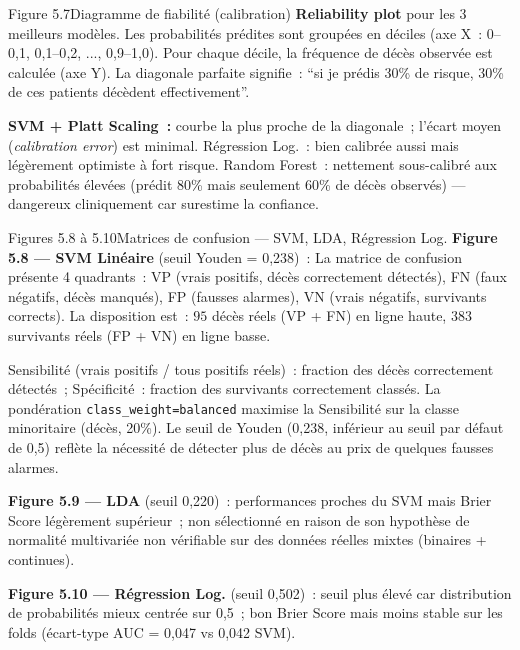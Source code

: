 \documentclass[12pt,a4paper]{article}
\begin{document}
\begin{figbox}{Figure 5.7}{Diagramme de fiabilité (calibration)}
\textbf{Reliability plot} pour les 3 meilleurs modèles. Les probabilités prédites
sont groupées en déciles (axe X~: 0--0{,}1, 0{,}1--0{,}2, ..., 0{,}9--1{,}0).
Pour chaque décile, la fréquence de décès observée est calculée (axe Y).
La diagonale parfaite signifie~: ``si je prédis 30\% de risque, 30\% de ces
patients décèdent effectivement''.

\textbf{SVM + Platt Scaling~:} courbe la plus proche de la diagonale~;
l'écart moyen (\textit{calibration error}) est minimal. Régression Log.~: bien
calibrée aussi mais légèrement optimiste à fort risque. Random Forest~: nettement
sous-calibré aux probabilités élevées (prédit 80\% mais seulement 60\% de décès
observés) --- dangereux cliniquement car surestime la confiance.
\end{figbox}

\begin{figbox}{Figures 5.8 à 5.10}{Matrices de confusion --- SVM, LDA, Régression Log.}
\textbf{Figure 5.8 --- SVM Linéaire} (seuil Youden = 0{,}238)~:
La matrice de confusion présente 4 quadrants~: VP (vrais positifs, décès
correctement détectés), FN (faux négatifs, décès manqués), FP (fausses
alarmes), VN (vrais négatifs, survivants corrects). La disposition est~:
$95$ décès réels (VP + FN) en ligne haute, $383$ survivants réels (FP + VN)
en ligne basse.

Sensibilité (vrais positifs / tous positifs réels)~: fraction des décès correctement
détectés~; Spécificité~: fraction des survivants correctement classés.
La pondération \texttt{class\_weight=balanced} maximise la Sensibilité sur la
classe minoritaire (décès, 20\%). Le seuil de Youden (0{,}238, inférieur au seuil
par défaut de 0{,}5) reflète la nécessité de détecter plus de décès au prix
de quelques fausses alarmes.

\textbf{Figure 5.9 --- LDA} (seuil 0{,}220)~: performances proches du SVM mais
Brier Score légèrement supérieur~; non sélectionné en raison de son hypothèse
de normalité multivariée non vérifiable sur des données réelles mixtes (binaires
+ continues).

\textbf{Figure 5.10 --- Régression Log.} (seuil 0{,}502)~: seuil plus élevé car
distribution de probabilités mieux centrée sur 0{,}5~; bon Brier Score mais
moins stable sur les folds (écart-type AUC = 0{,}047 vs 0{,}042 SVM).
\end{figbox}
\end{document}
